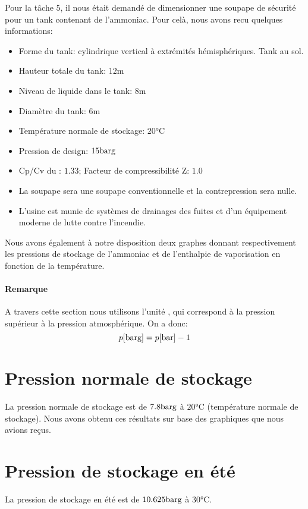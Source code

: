 Pour la t\^ache 5, il nous était demandé de dimensionner une soupape de sécurité
pour un tank contenant de l'ammoniac. Pour celà, nous avons recu quelques informations:

\begin{itemize}

\item Forme du tank: cylindrique vertical à extrémités hémisphériques. Tank au sol.
\item Hauteur totale du tank: $12 \si{\metre}$
\item Niveau de  liquide dans le tank: $8\si{\metre}$
\item Diamètre du tank: $6 \si{\metre}$
\item Température normale de stockage: $20 \si{\degreeCelsius}$
\item Pression de design: $15 \si{\bar}\text{g}$
\item Cp/Cv du : $1.33$; Facteur de compressibilité Z: $1.0$
\item La soupape sera une soupape conventionnelle et la contrepression sera nulle.
\item L’usine est munie de systèmes de drainages des fuites 
	et d’un équipement moderne de lutte contre l’incendie.
\end{itemize}

Nous avons également à notre disposition deux graphes donnant respectivement 
les pressions de stockage de l'ammoniac et de l'enthalpie de vaporisation 
en fonction de la température.

\paragraph{Remarque}
A travers cette section nous utilisons l'unité \barg, 
qui correspond à la pression supérieur à la pression atmosphérique.
On a donc:
\[ p [\si{\bar}\text{g}] = p [\si{\bar}] - 1 \]

\section{Pression normale de stockage} 
La pression normale de stockage est de $7.8 \si{\bar}\text{g}$ à $20\si{\celsius}$ 
(température normale de stockage). Nous avons obtenu ces résultats sur base des
graphiques que nous avions reçus.

\section{Pression de stockage en été} 
La pression de stockage en été est de $10.625 \si{\bar}\text{g}$ à $30\si{\celsius}$.

